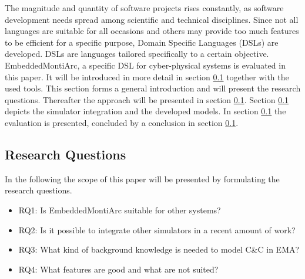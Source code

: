 The magnitude and quantity of software projects rises constantly, as software development needs spread among scientific and technical disciplines. Since not all languages are suitable for all occasions and others may provide too much features to be efficient for a specific purpose, Domain Specific Languages (DSLs) are developed. DSLs are languages tailored specifically to a certain objective.
EmbeddedMontiArc, a specific DSL for cyber-physical systems is evaluated in this paper. It will be introduced in more detail in section \ref{} together with the used tools. This section forms a general introduction and will present the research questions.
Thereafter the approach will be presented in section \ref{}. Section \ref{} depicts the simulator integration and the developed models. In section \ref{} the evaluation is presented, concluded by a conclusion in section \ref{}.

\subsection{Research Questions}
In the following the scope of this paper will be presented by formulating the research questions.
\begin{itemize}
	\item RQ1: Is EmbeddedMontiArc suitable for other systems?
	\item RQ2: Is it possible to integrate other simulators in a recent amount of work?
	\item RQ3: What kind of background knowledge is needed to model C\&C in EMA?
	\item RQ4: What features are good and what are not suited?
\end{itemize}
